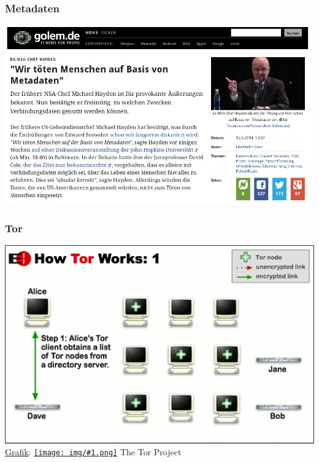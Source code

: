 \documentclass[12pt]{beamer}
\newcommand{\cc}[1]{\texttt{[image: img/\#1.png]}\hspace{1mm}}
\begin{document}
\begin{frame}
    \frametitle{Metadaten}
    \begin{center}
	\includegraphics[height=0.7\textheight]{img/wekillpeople.jpg}
    \end{center}
\end{frame}

\begin{frame}
    \frametitle{Tor}
    \begin{center}
	\includegraphics[height=0.7\textheight]{img/tor1.png}
	\\{\small \href{https://www.torproject.org/images/htw1.png}{Grafik}: \href{https://creativecommons.org/licenses/by/3.0/us/}{\cc{by}} The Tor Project}
    \end{center}
\end{frame}
\end{document}
